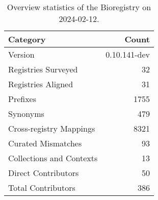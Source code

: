 \begin{table}
\caption{Overview statistics of the Bioregistry on 2024-02-12.}
\label{tab:bioregistry-summary}
\begin{tabular}{lr}
\toprule
Category & Count \\
\midrule
Version & 0.10.141-dev \\
Registries Surveyed & 32 \\
Registries Aligned & 31 \\
Prefixes & 1755 \\
Synonyms & 479 \\
Cross-registry Mappings & 8321 \\
Curated Mismatches & 93 \\
Collections and Contexts & 13 \\
Direct Contributors & 50 \\
Total Contributors & 386 \\
\bottomrule
\end{tabular}
\end{table}
